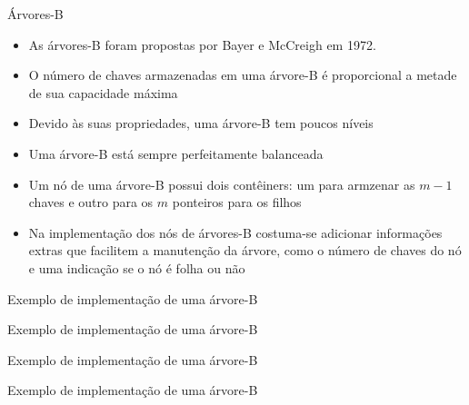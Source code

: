 \begin{frame}[fragile]{Árvores-B}

	\begin{itemize}
		\item As árvores-B foram propostas por Bayer e McCreigh em 1972.

		\item O número de chaves armazenadas em uma árvore-B é proporcional a metade de 
            sua capacidade máxima

		\item Devido às suas propriedades, uma árvore-B tem poucos níveis

		\item Uma árvore-B está sempre perfeitamente balanceada

		\item Um nó de uma árvore-B possui dois contêiners: um para armzenar as $m-1$ chaves e 
            outro para os  $m$ ponteiros para os filhos

		\item Na implementação dos nós de árvores-B costuma-se adicionar informações extras que 
            facilitem a manutenção da árvore, como o número de chaves do nó e uma indicação se o 
            nó é folha ou não
	\end{itemize}

\end{frame}

\begin{frame}[fragile]{Exemplo de implementação de uma árvore-B}
\end{frame}

\begin{frame}[fragile]{Exemplo de implementação de uma árvore-B}
\end{frame}

\begin{frame}[fragile]{Exemplo de implementação de uma árvore-B}
\end{frame}

\begin{frame}[fragile]{Exemplo de implementação de uma árvore-B}
\end{frame}
